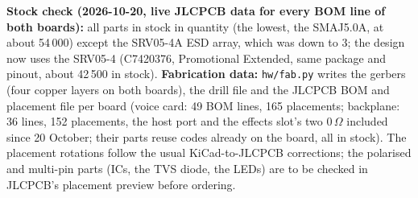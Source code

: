 \documentclass[11pt,a4paper]{article}
\newcommand{\file}[1]{\texttt{#1}}
\begin{document}
\textbf{Stock check (2026-10-20, live JLCPCB data for every BOM line of both boards):} all parts in stock in
quantity (the lowest, the SMAJ5.0A, at about 54\,000) except the SRV05-4A ESD array, which was down to 3; the design
now uses the SRV05-4 (C7420376, Promotional Extended, same package and pinout, about 42\,500 in stock).
\textbf{Fabrication data:} \file{hw/fab.py} writes the gerbers (four copper layers on both boards), the drill file and
the JLCPCB BOM and placement file per board (voice card: 49 BOM lines, 165 placements; backplane: 36 lines, 152
placements, the host port and the effects slot's two 0\,$\Omega$ included since 20 October; their parts reuse codes already on the board, all in stock). The placement rotations follow the usual KiCad-to-JLCPCB corrections; the polarised and multi-pin
parts (ICs, the TVS diode, the LEDs) are to be checked in JLCPCB's placement preview before ordering.

\begin{table}[htbp]
\centering\footnotesize
\caption{Lines that are not Basic parts (generated): all Promotional Extended except C3001172 (CH32V203C8T6,
Extended, from the personal stock).}\label{tab:promo}

\end{table}
\end{document}
